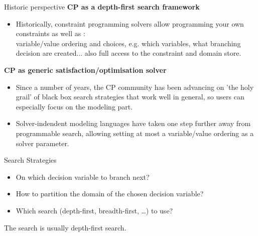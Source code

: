 \documentclass{cons-beamer}
\begin{document}
\begin{frame}{Historic perspective}
  \textbf{CP as a depth-first search framework}
  \begin{itemize}    
    \item Historically, constraint programming solvers allow programming your own constraints as well as :\\
      variable/value ordering and choices, e.g. which variables, what branching decision are created... also full access to the constraint and domain store.
  \end{itemize}

  \textbf{CP as generic satisfaction/optimisation solver}
  \begin{itemize}
    \item Since a number of years, the CP community has been advancing on 'the holy grail' of black box search strategies that work well in general, so users can especially focus on the modeling part.
    \item Solver-indendent modeling languages have taken one step further away from programmable search, allowing setting at most a variable/value ordering as a solver parameter.
  \end{itemize}
\end{frame}

\begin{frame}{Search Strategies}\label{searchCP}
  \begin{itemize}
    \item On which decision variable to branch next?
    \item How to partition the domain of the chosen decision variable?
    \item Which search (depth-first, breadth-first, \dots) to use?
  \end{itemize}

  The search is usually depth-first search.
\end{frame}
\end{document}
